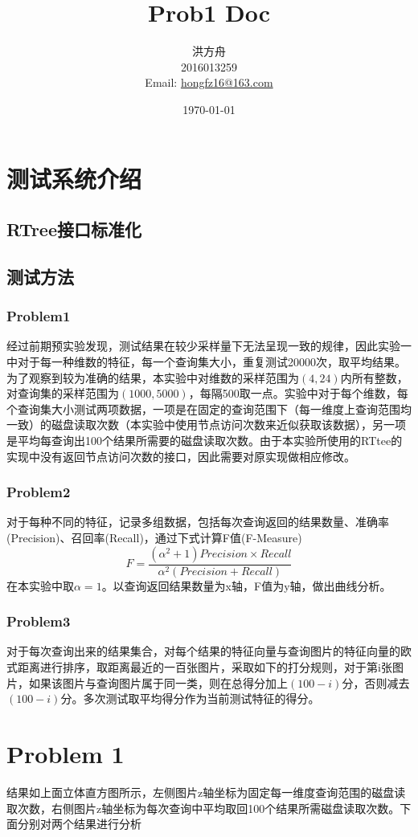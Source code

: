 \documentclass[12pt]{article}
\title{Prob1 Doc}
\author{洪方舟\\2016013259\\Email: \href{mailto:hongfz16@163.com}{hongfz16@163.com}}
\date{\today}
\begin{document}
  \maketitle
  \section*{测试系统介绍}
  	\subsection*{RTree接口标准化}
  	\subsection*{测试方法}
  		\subsubsection*{Problem1}
  			经过前期预实验发现，测试结果在较少采样量下无法呈现一致的规律，因此实验一中对于每一种维数的特征，每一个查询集大小，重复测试20000次，取平均结果。为了观察到较为准确的结果，本实验中对维数的采样范围为$(4,24)$内所有整数，对查询集的采样范围为$(1000,5000)$，每隔500取一点。实验中对于每个维数，每个查询集大小测试两项数据，一项是在固定的查询范围下（每一维度上查询范围均一致）的磁盘读取次数（本实验中使用节点访问次数来近似获取该数据），另一项是平均每查询出100个结果所需要的磁盘读取次数。由于本实验所使用的RTtee的实现中没有返回节点访问次数的接口，因此需要对原实现做相应修改。
  		\subsubsection*{Problem2}
  			对于每种不同的特征，记录多组数据，包括每次查询返回的结果数量、准确率(Precision)、召回率(Recall)，通过下式计算F值(F-Measure)
  			\begin{equation*}
	  			F = \frac{(\alpha^2+1)Precision \times Recall}{\alpha^2(Precision+Recall)}
  			\end{equation*}
  			在本实验中取$\alpha=1$。以查询返回结果数量为x轴，F值为y轴，做出曲线分析。
  		\subsubsection*{Problem3}
  			对于每次查询出来的结果集合，对每个结果的特征向量与查询图片的特征向量的欧式距离进行排序，取距离最近的一百张图片，采取如下的打分规则，对于第i张图片，如果该图片与查询图片属于同一类，则在总得分加上$(100-i)$分，否则减去$(100-i)$分。多次测试取平均得分作为当前测试特征的得分。
  \section*{Problem 1}
  	结果如上面立体直方图所示，左侧图片z轴坐标为固定每一维度查询范围的磁盘读取次数，右侧图片z轴坐标为每次查询中平均取回100个结果所需磁盘读取次数。下面分别对两个结果进行分析
\end{document}
